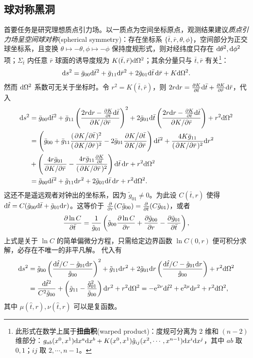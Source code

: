 \subsection{球对称黑洞}

首要任务是研究理想质点引力场。以一质点为空间坐标原点，观测结果建议\textit{质点引力场呈空间球对称}(spherical symmetry)：存在坐标系 $\{\bar t,\bar r,\theta,\phi\}$，空间部分为正交球坐标系，且变换 $\theta\mapsto -\theta,\phi\mapsto -\phi$ 保持度规形式，则对经纬度只存在 $\dd\theta^2,\dd\phi^2$ 项；$\Sigma_{\bar t}$ 内任意 $\bar r$ 球面的诱导度规为 $K(\bar t,\bar r)\dd\Omega^2$；其余分量只与 $\bar t,\bar r$ 有关\footnote{此形式在数学上属于\textbf{扭曲积}(warped product)：度规可分离为 2 维和 $(n-2)$ 维部分：$g_{ab}(x^0,x^1)\dd x^a\dd x^b+K(x^0,x^1)\hat g_{ij}(x^2,\cdots,x^{n-1})\dd x^i\dd x^j$，其中 $ab$ 取 $0,1$；$ij$ 取 $2,\cdots,n-1$。}：
\[\dd s^2=\bar g_{00}\dd\bar t^2+\bar g_{11}\dd\bar r^2+2\bar g_{01}\dd\bar t\,\dd\bar r+K\dd\Omega^2.\]
然而 $\dd\Omega^2$ 系数可无关于坐标时。令 $r^2=K(\bar t,\bar r)$，则 $2r\dd r=\pdv{K}{\bar t}\dd\bar t+\pdv{K}{\bar r}\dd\bar r$，代入
\begin{align*}
    \dd s^2&=\bar g_{00}\dd\bar t^2+\bar g_{11}\left(\frac{2r\dd r-\pdv{K}{\bar t}\dd\bar t}{\pdv*{K}{\bar r}}\right)^2+2\bar g_{01}\dd\bar t\left(\frac{2r\dd r-\pdv{K}{\bar t}\dd\bar t}{\pdv*{K}{\bar r}}\right)+r^2\dd\Omega^2\\
    &=\left(\bar g_{00}+\bar g_{11}\frac{(\pdv*{K}{\bar t})^2}{(\pdv*{K}{\bar r})^2}-2\bar g_{01}\frac{\pdv*{K}{\bar t}}{\pdv*{K}{\bar r}}\right)\dd\bar t^2+\frac{4K\bar g_{11}}{(\pdv*{K}{\bar r})^2}\dd r^2\\
    &+\left(\frac{4r\bar g_{01}}{\pdv*{K}{\bar r}}-\frac{4r\bar g_{11}\pdv{K}{\bar t}}{(\pdv*{K}{\bar r})^2}\right)\dd\bar t\,\dd r+r^2\dd\Omega^2\\
    &=\tilde g_{00}\dd\bar t^2+\tilde g_{11}\dd r^2+2\tilde g_{01}\dd\bar t\,\dd r+r^2\dd\Omega^2.
\end{align*}
这还不是遥远观者对钟出的坐标系，因为 $\tilde g_{01}\ne 0$。为此设 $C(\bar t,r)$ 使得 $\dd\hat t=C(\tilde g_{00}\dd\bar t+\tilde g_{01}\dd r)$。这等价于 $\pdv{r}(C\tilde g_{00})=\pdv{\bar t}(C\tilde g_{01})$，或者
\[
    \pdv{\ln C}{\bar t}=\frac{1}{\tilde g_{01}}\left(\tilde g_{00}\pdv{\ln C}{r}+\pdv{\tilde g_{00}}{r}-\pdv{\tilde g_{01}}{\bar t}\right),
\]
上式是关于 $\ln C$ 的简单偏微分方程，只需给定边界函数 $\ln C(0,r)$ 便可积分求解，必存在不唯一的非平凡解。
代入有
\begin{align*}
    \dd s^2&=\tilde g_{00}\left(\frac{\dd\hat t/C-\tilde g_{01}\dd r}{\tilde g_{00}}\right)^2+\tilde g_{11}\dd r^2+2\tilde g_{01}\dd r\left(\frac{\dd\hat t/C-\tilde g_{01}\dd r}{\tilde g_{00}}\right)+r^2\dd\Omega^2\\
    &=\frac{\dd\hat t^2}{C^2\tilde g_{00}}+\left(\tilde g_{11}-\frac{\tilde g_{01}^2}{\tilde g_{00}}\right)\dd r^2+r^2\dd\Omega^2=-\mathrm{e}^{2\nu}\dd\hat t^2+\mathrm{e}^{2\mu}\dd r^2+r^2\dd\Omega^2,
\end{align*}
其中 $\mu(\hat t,r),\nu(\hat t,r)$ 可以是复函数。

